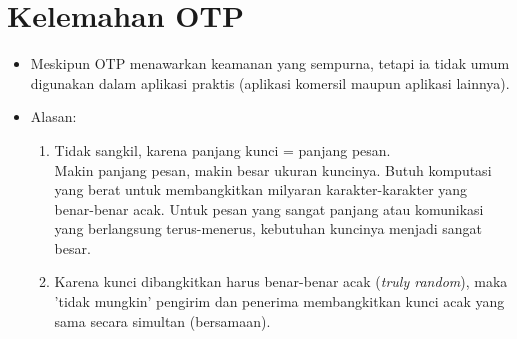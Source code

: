 \documentclass{article}
\begin{document}

\section*{Kelemahan OTP}

\begin{itemize}
    \item Meskipun OTP menawarkan keamanan yang sempurna, tetapi ia tidak umum digunakan dalam aplikasi praktis (aplikasi komersil maupun aplikasi lainnya).
    \item Alasan:
    \begin{enumerate}
        \item Tidak sangkil, karena panjang kunci = panjang pesan. \\
        Makin panjang pesan, makin besar ukuran kuncinya. Butuh komputasi yang berat untuk membangkitkan milyaran karakter-karakter yang benar-benar acak. Untuk pesan yang sangat panjang atau komunikasi yang berlangsung terus-menerus, kebutuhan kuncinya menjadi sangat besar.
        \item Karena kunci dibangkitkan harus benar-benar acak (\textit{truly random}), maka 'tidak mungkin' pengirim dan penerima membangkitkan kunci acak yang sama secara simultan (bersamaan).
    \end{enumerate}
\end{itemize}
\end{document}
